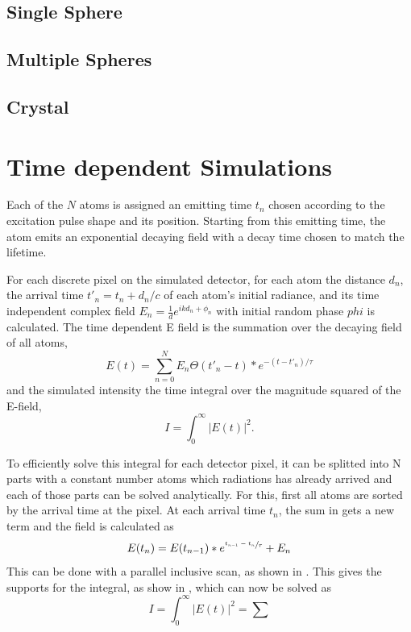 \subsection{Single Sphere}
\subsection{Multiple Spheres}
\subsection{Crystal}
\section{Time dependent Simulations}

Each of the $N$ atoms is assigned an emitting time $t_{n}$ chosen according to the excitation pulse shape and its position. Starting from this emitting time, the atom emits an exponential decaying field with a decay time chosen to match the lifetime. 


For each discrete pixel on the simulated detector, for each atom the distance $d_n$, the arrival time $t'_n=t_n+d_n/c$ of each atom's initial radiance, and its time independent complex field $E_n=\frac{1}{d} e^{ikd_n+\phi_n}$ with initial random phase $phi$ is calculated.
The time dependent E field is the summation over the decaying field of all atoms,
\begin{equation}
E(t)=\sum_{n=0}^N  E_n \Theta(t'_n  - t) * e^{-(t-t'_n )/\tau}
\label{eq:tdsum}
\end{equation}
and the simulated intensity the time integral over the magnitude squared of the E-field,
\begin{equation}
I=\int_0^\infty \left| E(t) \right|^2 .
\end{equation}

To efficiently solve this integral for each detector pixel, it can be splitted into N parts with a constant number atoms which radiations has already arrived and each of those parts can be solved analytically. For this, first all atoms are sorted by the arrival time at the pixel. At each arrival time $t_n$, the sum in  gets a new term and the field is calculated as
\begin{equation}
E(t_n)=E(t_{n-1})*e^{\sfrac{t_{n-1}-t_n}{\tau}}+E_n
\end{equation}
 This can be done with a parallel inclusive scan, as shown in . This gives the supports for the integral, as show in , which can now be solved as
\begin{equation}
	I=\int_0^\infty \left| E(t) \right|^2 = \sum
\end{equation}



